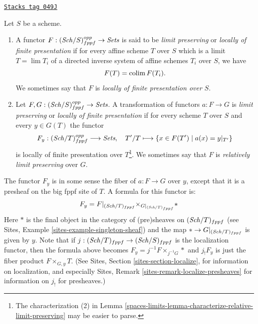 \begin{definition}
\label{spaces-limits-definition-locally-finite-presentation}
\href{https://stacks.math.columbia.edu/tag/049J}{\texttt{Stacks tag 049J}}

Let $S$ be a scheme.
\begin{enumerate}
\item A functor $F : (\mathit{Sch}/S)_{fppf}^{opp} \to \textit{Sets}$
is said to be {\it limit preserving} or {\it locally of finite presentation} if
for every affine scheme $T$ over $S$ which is a limit $T = \lim T_i$
of a directed inverse system of affine schemes $T_i$ over $S$, we have
$$
F(T) = \operatorname{colim} F(T_i).
$$
We sometimes say that $F$ is {\it locally of finite presentation over $S$}.
\item Let $F, G : (\mathit{Sch}/S)_{fppf}^{opp} \to \textit{Sets}$.
A transformation of functors $a : F \to G$
is {\it limit preserving} or {\it locally of finite presentation}
if for every scheme $T$ over $S$ and every $y \in G(T)$ the functor
$$
F_y : (\mathit{Sch}/T)_{fppf}^{opp} \longrightarrow \textit{Sets}, \quad
T'/T \longmapsto \{x \in F(T') \mid a(x) = y|_{T'}\}
$$
is locally of finite presentation over $T$\footnote{The characterization (2) in
Lemma \ref{spaces-limits-lemma-characterize-relative-limit-preserving}
may be easier to parse.}. We sometimes say that
$F$ is {\it relatively limit preserving} over $G$.
\end{enumerate}
\end{definition}

The functor $F_y$ is in some sense the fiber of
$a : F \to G$ over $y$, except that it is a presheaf on the big fppf
site of $T$. A formula for this functor is:
\begin{equation}
\label{equation-fibre-map-functors}
F_y =
F|_{(\mathit{Sch}/T)_{fppf}}
{\times}_{G|_{(\mathit{Sch}/T)_{fppf}}}
*
\end{equation}
Here $*$ is the final object in the category of (pre)sheaves
on $(\mathit{Sch}/T)_{fppf}$ (see
Sites, Example \ref{sites-example-singleton-sheaf})
and the map $* \to G|_{(\mathit{Sch}/T)_{fppf}}$ is given by $y$.
Note that if $j : (\mathit{Sch}/T)_{fppf} \to (\mathit{Sch}/S)_{fppf}$
is the localization functor, then the formula above becomes
$F_y = j^{-1}F \times_{j^{-1}G} *$ and $j_!F_y$ is just the fiber product
$F \times_{G, y} T$. (See
Sites, Section \ref{sites-section-localize},
for information on localization, and especially
Sites, Remark \ref{sites-remark-localize-presheaves}
for information on $j_!$ for presheaves.)

